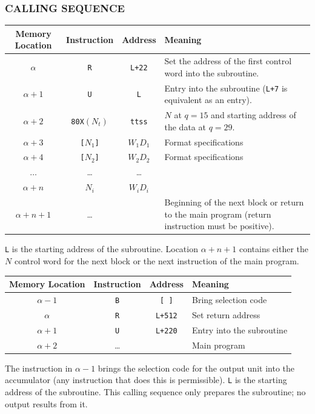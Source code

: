 \subsubsection*{CALLING SEQUENCE}
\begin{table}[h!]
\centering
\begin{tabularx}{\textwidth}{cccX}
\toprule
\textbf{Memory Location} & \textbf{Instruction} & \textbf{Address} & \textbf{Meaning} \\
\midrule
$\alpha$               & \texttt{R}      & \texttt{L+22}    & Set the address of the first control word into the subroutine. \\
$\alpha+1$             & \texttt{U}      & \texttt{L}       & Entry into the subroutine (\texttt{L+7} is equivalent as an entry). \\
$\alpha+2$             & \texttt{80X$(N_t)$}    & \texttt{ttss}    & $N$ at $q=15$ and starting address of the data at $q=29$. \\
$\alpha+3$             & \texttt{[$N_1$]}   & \texttt{$W_1 D_1$}   & Format specifications \\
$\alpha+4$             & \texttt{[$N_2$]}   & \texttt{$W_2 D_2$}   & Format specifications \\
$\dots$           & \dots           & \dots            & \\
$\alpha+n$             & \texttt{$N_i$}     & \texttt{$W_i D_i$}   & \\
$\alpha+n+1$           & \dots           &                  & Beginning of the next block or return to the main program (return instruction must be positive). \\
\bottomrule
\end{tabularx}
\end{table}
\texttt{L} is the starting address of the subroutine. Location $\alpha+n+1$ contains either the $N$ control word for the next block or the next instruction of the main program.

\begin{table}[h!]
\centering
\begin{tabularx}{\textwidth}{cccX}
\toprule
\textbf{Memory Location} & \textbf{Instruction} & \textbf{Address} & \textbf{Meaning} \\
\midrule
$\alpha-1$             & \texttt{B}      & \texttt{[ ]}     & Bring selection code \\
$\alpha$               & \texttt{R}      & \texttt{L+512}   & Set return address \\
$\alpha+1$             & \texttt{U}      & \texttt{L+220}   & Entry into the subroutine \\
$\alpha+2$             & \dots           &                  & Main program \\
\bottomrule
\end{tabularx}
\end{table}
The instruction in $\alpha-1$ brings the selection code for the output unit into the accumulator (any instruction that does this is permissible). \texttt{L} is the starting address of the subroutine. This calling sequence only prepares the subroutine; no output results from it.

